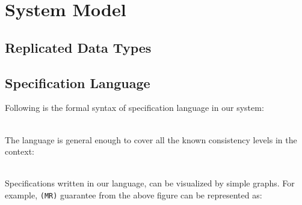 \newpage
\section{System Model}
\subsection{Replicated Data Types}
\subsection{Specification Language}
\label{subsec:spec_lang}
Following is the formal syntax of specification language in our system:

\\ The language is general enough to cover all  the known consistency
levels in the context:

\\ Specifications written in our language, can be visualized by simple
graphs. For example, \texttt{(MR)} guarantee from the above figure can
be represented as:

